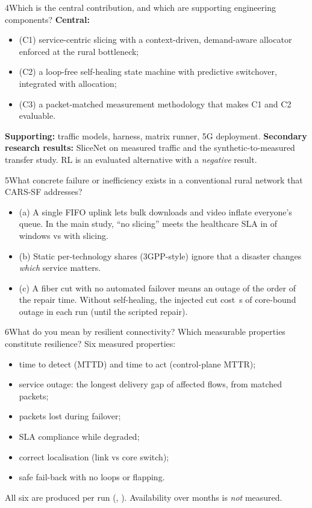\begin{qa}{4}{Which is the central contribution, and which are supporting engineering components?}
\textbf{Central:}
\begin{itemize}
\item (C1) service-centric slicing with a context-driven, demand-aware allocator enforced at the rural bottleneck;
\item (C2) a loop-free self-healing state machine with predictive switchover, integrated with allocation;
\item (C3) a packet-matched measurement methodology that makes C1 and C2 evaluable.
\end{itemize}
\textbf{Supporting:} traffic models, harness, matrix runner, 5G deployment.
\textbf{Secondary research results:} SliceNet on measured traffic and the synthetic-to-measured transfer study.
RL is an evaluated alternative with a \emph{negative} result.
\end{qa}

\begin{qa}{5}{What concrete failure or inefficiency exists in a conventional rural network that CARS-SF addresses?}
\begin{itemize}
\item (a) A single FIFO uplink lets bulk downloads and video inflate everyone's queue. In the main study, ``no slicing''
meets the healthcare SLA in \NHcSlaNoSlicing{} of windows vs \NHcSlaProposed{} with slicing.
\item (b) Static per-technology shares (3GPP-style) ignore that a disaster changes \emph{which} service matters.
\item (c) A fiber cut with no automated failover means an outage of the order of the repair time. Without self-healing,
the injected cut cost \NOutCutNoneMean\,s of core-bound outage in each run (until the scripted repair).
\end{itemize}
\end{qa}

\begin{qa}{6}{What do you mean by resilient connectivity? Which measurable properties constitute resilience?}
Six measured properties:
\begin{itemize}
\item time to detect (MTTD) and time to act (control-plane MTTR);
\item service outage: the longest delivery gap of affected flows, from matched packets;
\item packets lost during failover;
\item SLA compliance while degraded;
\item correct localisation (link vs core switch);
\item safe fail-back with no loops or flapping.
\end{itemize}
All six are produced per run (, ).
Availability over months is \emph{not} measured.
\end{qa}


